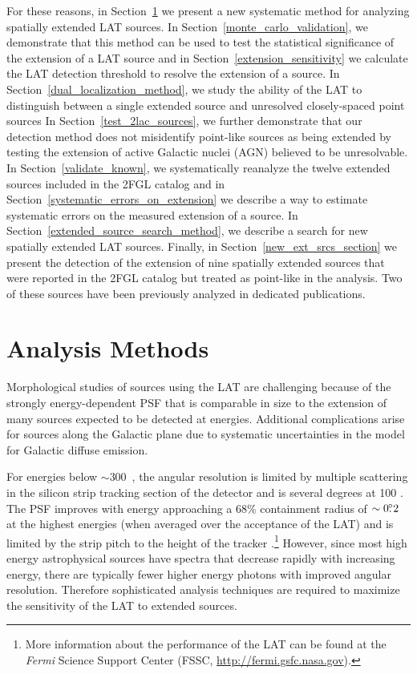 \documentclass[12pt,preprint]{aastex}
\newcommand{\mev}{\text{MeV}\xspace}
\newcommand{\gev}{\text{GeV}\xspace}
\newcommand{\fermi}{\textit{Fermi}\xspace}
\begin{document}
 For these reasons, in Section~\ref{analysis_methods_section}
we present a new systematic method for analyzing spatially extended
LAT sources.  In Section~\ref{monte_carlo_validation}, we demonstrate
that this method can be used to test the statistical significance of the
extension of a LAT source and in Section~\ref{extension_sensitivity}
we calculate the LAT detection threshold to resolve the extension
of a source.  In Section~\ref{dual_localization_method}, we
study the ability of the LAT to 
distinguish between a single extended source and unresolved closely-spaced point sources
In Section~\ref{test_2lac_sources}, we further demonstrate that our
detection method does not misidentify point-like sources as being
extended by testing the extension of active Galactic nuclei (AGN)
believed to be unresolvable.  In Section~\ref{validate_known},
we systematically reanalyze the twelve extended sources included
in the 2FGL catalog and in Section~\ref{systematic_errors_on_extension}
we describe a way to estimate systematic errors on the measured extension of a source.
In Section~\ref{extended_source_search_method}, we
describe a search for new spatially extended LAT sources. Finally,
in Section~\ref{new_ext_srcs_section} we present the detection of the
extension of nine spatially extended sources that were reported in the 2FGL catalog
but treated as point-like in the analysis.  Two of these sources have been previously analyzed in
dedicated publications.


\section{Analysis Methods}
\label{analysis_methods_section}

Morphological studies of sources using the LAT are challenging
because of the strongly energy-dependent PSF that is comparable in
size to the extension of many sources expected to be detected at
\gev energies.  Additional complications arise for sources along
the Galactic plane due to systematic uncertainties in the model for
Galactic diffuse emission.  

For energies below $\sim$300~\mev, the angular resolution is limited by
multiple scattering in the silicon strip tracking section
of the detector and is several degrees at 100 \mev.  The PSF improves
with energy approaching a 68\% containment radius of $\sim0\mbox{$.\!\!^\circ$}2$ at
the highest energies (when averaged over the acceptance of the LAT)
and is limited by the strip pitch to the height of the tracker
\citep{atwood_LAT_mission,on_orbit_calibration,lat_on_orbit_psf}.\footnote{More
information about the performance of the LAT can be found at the \fermi
Science Support Center (FSSC, \url{http://fermi.gsfc.nasa.gov}).} However,
since most high energy astrophysical sources have spectra that decrease
rapidly with increasing energy, there are typically fewer higher
energy photons with improved angular resolution. Therefore sophisticated
analysis techniques are required to maximize the sensitivity of the LAT
to extended sources.
\end{document}
